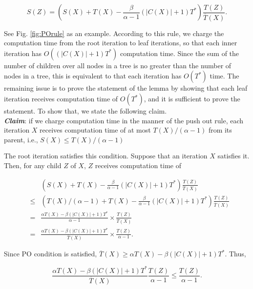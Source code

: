 \documentclass{llncs}
\begin{document}
\vspace{-1mm}
\[ S(Z) = (S(X) + T(X) - \frac{\beta}{\alpha-1} (|C(X)|+1)T^*)
 \frac{T(Z)}{\overline{T}(X)}. \]
\vspace{-3mm}

\noindent
See Fig. \ref{fig:POrule} as an example.
According to this rule, we charge the computation time from the root
 iteration to leaf iterations, so that each inner iteration has 
 $O((|C(X)|+1)T^*)$ computation time.
Since the sum of the number of children over all nodes in a tree is
 no greater than the number of nodes in a tree,
  this is equivalent to that each iteration has $O(T^*)$ time.
The remaining issue is to prove the statement of the lemma by showing
 that each leaf iteration receives computation time of $O(T^*)$, 
 and it is sufficient to prove the statement.
To show that, we state the following claim.\\
 
\vspace{-2mm}
\noindent 
{\bf \em Claim}: if we charge computation time in the manner of the push
 out rule, each iteration $X$ receives computation time of at most
 $T(X) / (\alpha-1)$ from its parent, i.e., $S(X) \le T(X) / (\alpha-1)$\\
\vspace{-2mm}

\noindent
The root iteration satisfies this condition.
Suppose that an iteration $X$ satisfies it.
Then, for any child $Z$ of $X$, $Z$ receives computation time of 

\vspace{-4mm}
\begin{eqnarray*}
 && (S(X) + T(X) - \frac{\beta}{\alpha-1} (|C(X)|+1)T^*)
      \frac{T(Z)}{\overline{T}(X)}\\
 &\le& (T(X) / (\alpha-1) + T(X) - \frac{\beta}{\alpha-1} (|C(X)|+1)T^*)
      \frac{T(Z)}{\overline{T}(X)}\\
 &=& \frac{\alpha T(X) - \beta (|C(X)|+1)T^*}{\alpha-1} \times
      \frac{T(Z)}{\overline{T}(X)}\\
 &=& \frac{\alpha T(X) - \beta (|C(X)|+1)T^*}{\overline{T}(X)} \times
      \frac{T(Z)}{\alpha-1}.
\end{eqnarray*}
\vspace{-3mm}

\noindent
Since PO condition is satisfied, 
 $\overline{T}(X) \ge \alpha T(X) - \beta (|C(X)|+1)T^*$.
Thus, 

\vspace{-1mm}
\[ \frac{\alpha T(X) - \beta (|C(X)|+1)T^*}{\overline{T}(X)}
 \frac{T(Z)}{\alpha-1} \le \frac{T(Z)}{\alpha-1}. \]
\vspace{-2mm}
\end{document}
